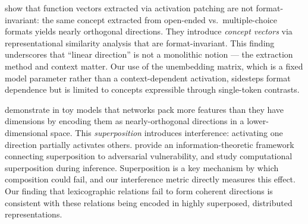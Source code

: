 \citet{opielka2026causality} show that function vectors extracted via activation patching are not format-invariant: the same concept extracted from open-ended vs.\ multiple-choice formats yields nearly orthogonal directions.
They introduce \emph{concept vectors} via representational similarity analysis that are format-invariant.
This finding underscores that ``linear direction'' is not a monolithic notion --- the extraction method and context matter.
Our use of the unembedding matrix, which is a fixed model parameter rather than a context-dependent activation, sidesteps format dependence but is limited to concepts expressible through single-token contrasts.

\citet{elhage2022superposition} demonstrate in toy models that networks pack more features than they have dimensions by encoding them as nearly-orthogonal directions in a lower-dimensional space.
This \emph{superposition} introduces interference: activating one direction partially activates others.
\citet{bereska2025superposition} provide an information-theoretic framework connecting superposition to adversarial vulnerability, and \citet{hanni2024computational} study computational superposition during inference.
Superposition is a key mechanism by which composition could fail, and our interference metric directly measures this effect.
Our finding that lexicographic relations fail to form coherent directions is consistent with these relations being encoded in highly superposed, distributed representations.
